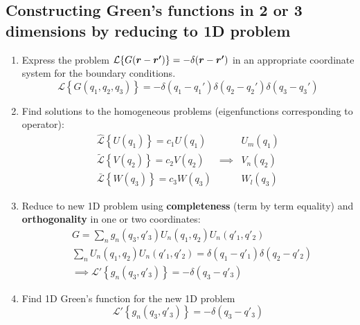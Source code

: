 \subsection{Constructing Green's functions in 2 or 3 dimensions by reducing to 1D problem}
\begin{enumerate}
  \item Express the problem $\mathcal{L}\{G(\boldsymbol{r}-\boldsymbol{r'})\} = -\delta(\boldsymbol{r}-\boldsymbol{r'})$ in an appropriate coordinate system for the boundary conditions.
        \begin{equation*}
          \mathcal{L}\left\{G(q_{1}, q_{2}, q_{3})\right\} = -\delta(q_{1}-q_{1}') \delta(q_{2}-q_{2}') \delta(q_{3}-q_{3}')
        \end{equation*}
  \item Find solutions to the homogeneous problems (eigenfunctions corresponding to operator):
        \begin{align*}
          \mathcal{\hat{L}} \left\{U(q_{1})\right\} = c_{1}U(q_{1}) & & U_{m}(q_{1})\\
          \mathcal{\tilde{L}} \left\{V(q_{2})\right\} = c_{2}V(q_{2}) & \implies & V_{n}(q_{2})\\
          \mathcal{\bar{L}} \left\{W(q_{3})\right\} = c_{3}W(q_{3}) & & W_{l}(q_{3})
        \end{align*}
  \item Reduce to new 1D problem using \textbf{completeness} (term by term equality) and \textbf{orthogonality} in one or two coordinates:
        \begin{align*}
          &G = \sum\limits_{n} g_{n}(q_{3},q'_{3}) U_{n}(q_{1},q_{2})U_{n}(q'_{1},q'_{2})\\
          &\sum\limits_{n} U_{n}(q_{1},q_{2}) U_{n}(q'_{1},q'_{2}) = \delta(q_{1}-q'_{1})\delta(q_{2}-q'_{2})\\
          &\implies \mathcal{L'}\left\{g_{n}(q_{3},q'_{3})\right\} = -\delta(q_{3}-q'_{3})
        \end{align*}
  \item Find 1D Green's function for the new 1D problem
        \begin{equation*}
          \mathcal{L'}\left\{g_{n}(q_{3},q'_{3})\right\} = -\delta(q_{3}-q'_{3})
        \end{equation*}
\end{enumerate}

